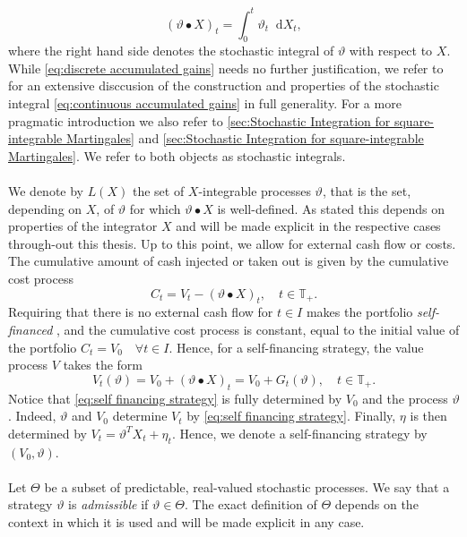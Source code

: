 \documentclass[11pt,a4paper,twoside,openany]{report}
\newcommand{\diff}{\mathop{}\!\mathrm{d}}
\theoremstyle{plain} %
\theoremstyle{definition} %
\theoremstyle{remark} %
\let\parencite\authnumparencite
\begin{document}
\begin{equation}\label{eq:continuous accumulated gains}
    (\vartheta \bullet X)_t=\int_0^t\vartheta_t\diff X_t,
\end{equation} 
where the right hand side denotes the stochastic integral of \(\vartheta\) with respect to \(X\). While \cref{eq:discrete accumulated gains} needs no further justification, we refer to \parencite{Protter2005StochasticIntegration} for an extensive disccusion of the construction and properties of the stochastic integral \cref{eq:continuous accumulated gains} in full generality. For a more pragmatic introduction we also refer to \cref{sec:Stochastic Integration for square-integrable Martingales} and \cref{sec:Stochastic Integration for square-integrable Martingales}. We refer to both objects as stochastic integrals. 
\\\\
We denote by \(L(X)\) the set of \(X\)-integrable processes \(\vartheta\), that is the set, depending on \(X\), of \(\vartheta\) for which \(\vartheta\bullet X\) is well-defined. As stated this depends on properties of the integrator \(X\) and will be made explicit in the respective cases through-out this thesis. 
\bigbreak
Up to this point, we allow for external cash flow or costs. The cumulative amount of cash injected or taken out is given by the cumulative cost process 
\begin{equation}
    C_t = V_t - (\vartheta \bullet X)_t,\quad t\in\mathbb{T}_+. 
\end{equation}
Requiring that there is no external cash flow for \(t\in I\) makes the portfolio \textit{self-financed} , and the cumulative cost process is constant, equal to the initial value of the  portfolio \(C_t=V_0\quad\forall t\in I\). Hence, for a self-financing strategy, the value process \(V\) takes the form
\begin{equation}\label{eq:self financing strategy}
    V_t(\vartheta) = V_0 + (\vartheta\bullet X)_t=V_0+G_t(\vartheta),\quad t\in\mathbb{T}_+. 
\end{equation}
Notice that \cref{eq:self financing strategy} is fully determined by \(V_0\) and the process \(\vartheta\). Indeed, \(\vartheta\) and \(V_0\) determine \(V_t\) by  \cref{eq:self financing strategy}. Finally, \(\eta\) is then determined by \(V_t = \vartheta^TX_t+\eta_t\). Hence, we denote a self-financing strategy by \((V_0,\vartheta)\).
\\\\
Let \(\Theta\) be a subset of predictable, real-valued stochastic processes. We say that a strategy \(\vartheta\) is \textit{admissible} if \(\vartheta\in\Theta\). The exact definition of \(\Theta\) depends on the context in which it is used and will be made explicit in any case.
\end{document}
